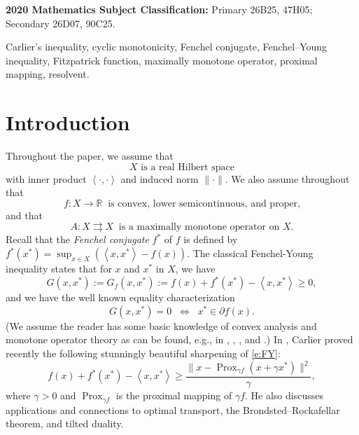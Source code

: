 \documentclass[12pt]{article}
\newcommand{\scal}[2]{\left\langle{#1},{#2}  \right\rangle}
\newcommand{\RR}{\ensuremath{\mathbb R}}
\newcommand{\prox}{\ensuremath{\operatorname{Prox}}}
\theoremstyle{definition}
\providecommand{\RR}{\mathbb{R}}
\providecommand{\RR}{\mathbb{R}}
\begin{document}
{\small
\noindent
{\bfseries 2020 Mathematics Subject Classification:}
{Primary 
26B25,
47H05; 
Secondary 
26D07, 
90C25. 
}

{\small
{}
Carlier's inequality, 
cyclic monotonicity,
Fenchel conjugate, 
Fenchel--Young inequality,
Fitzpatrick function, 
maximally monotone operator, 
proximal mapping,
resolvent. 
}

\section{Introduction}

Throughout the paper, we assume that 
\begin{equation}
\text{$X$ is a real Hilbert space}
\end{equation}
with inner product $\scal{\cdot}{\cdot}$ and induced norm $\|\cdot\|$. 
We also assume throughout that 
\begin{equation}
\label{e:f}
f\colon X\to\RR \;\;\text{is convex, lower semicontinuous, and proper,}
\end{equation}
and that 
\begin{equation}
\label{e:A}
A\colon X\rightrightarrows X \;\;\text{is a maximally monotone operator on $X$.}
\end{equation}
Recall that the \emph{Fenchel conjugate} $f^*$ of $f$ is defined by 
$f^*(x^*)=\sup_{x\in X}(\scal{x}{x^*}-f(x))$. 
The classical Fenchel-Young inequality states that 
for $x$ and $x^*$ in $X$, we have 
\begin{equation}
\label{e:FY}
G(x,x^*) := G_f(x,x^*) := f(x)+f^*(x^*) - \scal{x}{x^*}  \geq 0,
\end{equation}
and we have the well known equality characterization
\begin{equation}
\label{e:FY=}
G(x,x^*)=0
\;\;\Leftrightarrow\;\;
x^*\in\partial f(x). 
\end{equation}
(We assume the reader has some basic knowledge of convex analysis and monotone
operator theory as can be found, e.g., in \cite{BC2017}, \cite{MN}, \cite{Rocky}, 
and \cite{RW}.)
In \cite{Carlier}, Carlier proved recently the following stunningly 
beautiful sharpening 
of \cref{e:FY}: 
\begin{equation}
\label{e:220515a}
f(x)+f^*(x^*) -\scal{x}{x^*}\geq \frac{\|x-\prox_{\gamma f}(x+\gamma x^*)\|^2}{\gamma}, 
\end{equation}
where $\gamma>0$ and $\prox_{\gamma f}$ is the proximal mapping of $\gamma f$. 
He also discusses applications and connections to optimal transport, 
the Brondsted--Rockafellar theorem, and tilted duality.

}
\end{document}
